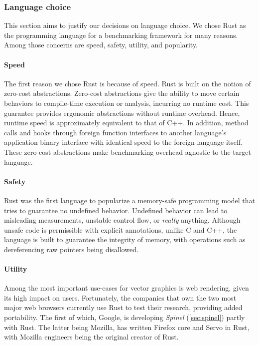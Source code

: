 \subsubsection{Language choice}
This section aims to justify our decisions on language choice. We chose Rust as the programming language for a benchmarking framework for many reasons. Among those concerns are speed, safety, utility, and popularity.\medskip

\paragraph{Speed}
The first reason we chose Rust is because of speed. Rust is built on the notion of zero-cost abstractions. Zero-cost abstractions give the ability to move certain behaviors to compile-time execution or analysis, incurring no runtime cost\cite{Dursun20}. This guarantee provides ergonomic abstractions without runtime overhead. Hence, runtime speed is approximately equivalent to that of C++. In addition, method calls and hooks through foreign function interfaces to another language's application binary interface with identical speed to the foreign language itself\cite{Crichton15}. These zero-cost abstractions make benchmarking overhead agnostic to the target language.

\paragraph{Safety}
Rust was the first language to popularize a memory-safe programming model that tries to guarantee no undefined behavior. Undefined behavior can lead to misleading measurements, unstable control flow, or \emph{really} anything. Although unsafe code is permissible with explicit annotations, unlike C and C++, the language is built to guarantee the integrity of memory, with operations such as dereferencing raw pointers being disallowed\cite{WhatUnsafeCanDo}.

\paragraph{Utility}
Among the most important use-cases for vector graphics is web rendering, given its high impact on users. Fortunately, the companies that own the two most major web browsers currently use Rust to test their research, providing added portability. The first of which, Google, is developing \textit{Spinel} (\cref{sec:spinel}) partly with Rust. The latter being Mozilla, has written Firefox core and Servo\cite{RustServo} in Rust, with Mozilla engineers being the original creator of Rust\cite{RustFoundation21}.\medskip

